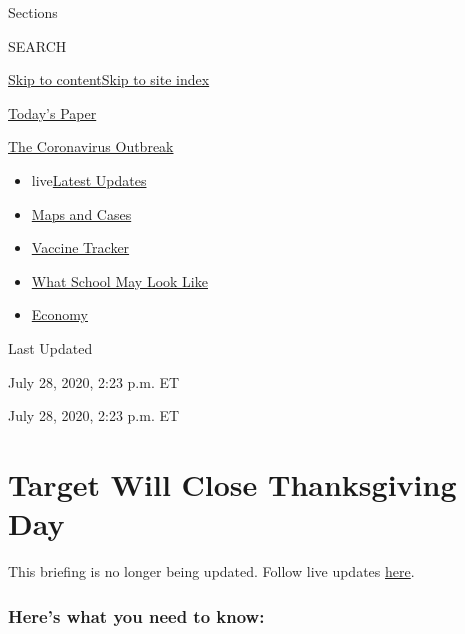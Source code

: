 Sections

SEARCH

\protect\hyperlink{site-content}{Skip to
content}\protect\hyperlink{site-index}{Skip to site index}

\href{https://myaccount.nytimes.com/auth/login?response_type=cookie\&client_id=vi}{}

\href{https://www.nytimes.com/section/todayspaper}{Today's Paper}

\href{https://www.nytimes.com/news-event/coronavirus}{The Coronavirus
Outbreak}

\begin{itemize}
\tightlist
\item
  live\href{https://www.nytimes.com/2020/08/01/world/coronavirus-covid-19.html}{Latest
  Updates}
\item
  \href{https://www.nytimes.com/interactive/2020/us/coronavirus-us-cases.html}{Maps
  and Cases}
\item
  \href{https://www.nytimes.com/interactive/2020/science/coronavirus-vaccine-tracker.html}{Vaccine
  Tracker}
\item
  \href{https://www.nytimes.com/interactive/2020/07/29/us/schools-reopening-coronavirus.html}{What
  School May Look Like}
\item
  \href{https://www.nytimes.com/live/2020/07/31/business/stock-market-today-coronavirus}{Economy}
\end{itemize}

Last Updated

July 28, 2020, 2:23 p.m. ET

July 28, 2020, 2:23 p.m. ET

\hypertarget{target-will-close-thanksgiving-day}{%
\section{Target Will Close Thanksgiving
Day}\label{target-will-close-thanksgiving-day}}

This briefing is no longer being updated. Follow live updates
\href{https://www.nytimes.com/live/2020/07/28/business/stock-market-today-coronavirus}{here}.

\hypertarget{heres-what-you-need-to-know}{%
\subsubsection{Here's what you need to
know:}\label{heres-what-you-need-to-know}}

